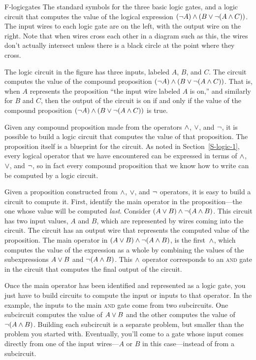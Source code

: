 \fig
   {F-logicgates}
   {The standard symbols for the three basic logic gates, and a
    logic circuit that computes the value of the logical
    expression $(\lnot A)\wedge(B\vee\lnot(A\wedge C))$.  The input wires to
    each logic gate are on the left, with the output wire on the
    right.  Note that when wires cross each other in a diagram
    such as this, the wires don't actually intersect unless
    there is a black circle at the point where they cross.}
   {  }
   

The logic circuit in the figure has three inputs, labeled
$A$, $B$, and $C$.  The circuit computes the value of the
compound proposition $(\lnot A)\wedge(B\vee\lnot(A\wedge C))$.
That is, when $A$ represents the proposition ``the input wire
labeled $A$ is on,'' and similarly for $B$ and $C$, then
the output of the circuit is on if and only if the
value of the compound proposition $(\lnot A)\wedge(B\vee\lnot(A\wedge C))$
is true.

Given any compound proposition made from the operators
$\wedge$, $\vee$, and $\lnot$, it is possible to build a logic
circuit
that computes the value of that proposition.  The
proposition itself is a blueprint for the circuit.  As noted
in Section~\ref{S-logic-1}, every logical operator that we have 
encountered can be expressed in terms of $\wedge$, $\vee$, and $\lnot$,
so in fact every compound proposition that we know how to write
can be computed by a logic circuit. 

Given a proposition constructed
from $\wedge$, $\vee$, and $\lnot$ operators, it is
easy to build a circuit to compute it.  First, identify the main
operator in the proposition---the one whose value will be
computed \emph{last}.  Consider $(A\vee B)\wedge\lnot(A\wedge B)$.
This circuit has two input values, $A$ and $B$, which are represented
by wires coming into the circuit.  The circuit has an output wire
that represents the computed value of the proposition.
The main operator in $(A\vee B)\wedge\lnot(A\wedge B)$,
is the first~$\wedge$, which computes the
value of the expression as a whole by combining the values
of the subexpressions $A\vee B$ and $\lnot(A\wedge B)$.  This $\wedge$
operator corresponds to an \textsc{and} gate in the circuit that
computes the final output of the circuit.

Once the main operator has been identified and represented as
a logic gate, you just have to build circuits to compute the
input or inputs to that operator.  In the  example,
the inputs to the main \textsc{and} gate come from two subcircuits.
One subcircuit computes the value of $A\vee B$ and the other
computes the value of $\lnot(A\wedge B)$.  Building each subcircuit
is a separate problem, but smaller than the problem you started
with.  Eventually, you'll come to a gate whose input comes directly
from one of the input wires---$A$ or $B$ in this case---instead of
from a subcircuit.


